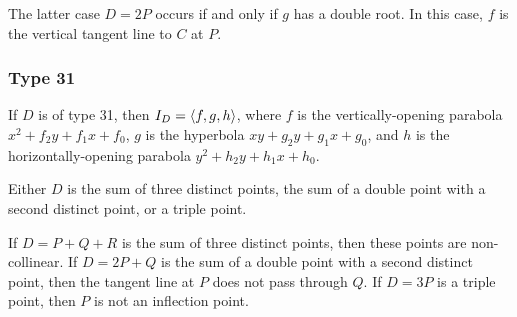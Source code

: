   The latter case $D = 2P$ occurs if and only if $g$ has a double root.
  In this case, $f$ is the vertical tangent line to $C$ at $P$.

\begin{comment}
\subsubsection{Type 21}
  If $D$ is of type 21, then $I_D = \pid{f, g}$, where $f$ is the non-vertical line $y + f_1x + f_0$
  and $g$ is the univariate polynomial $x^2 + g_1x + g_0$.
  Thus $D$ is the sum of two points on the line $f$, whose $x$-coordinates are the roots of $g$.
  
  There are two possibilities.
  If $g$ has two distinct roots, then $D = P + Q$ for two distinct points $P$ and $Q$.
  If $g$ has a double root, then $D = 2P$ and $f$ is the tangent line at $P$.
  
  So either $D$ is the sum of two distinct points with different $x$-coordinates,
  or $D$ is a double point $D = 2P$ and the tangent line at $P$ is non-vertical.
\end{comment}
\begin{comment}
\subsubsection{Type 22}
  If $D$ is of type 21, then $I_D = \pid{f, g}$, where $f$ is the vertical line $x + f_0$
  and $g$ is the univariate polynomial $y^2 + g_2y + g_0$.
  
  Either $D = P + Q$ is the sum of two distinct points with the same $x$-coordinate but different $y$-coordinates,
  or $D = 2P$ is a double point and the tangent line at $P$ is vertical.
\end{comment}

\subsubsection{Type 31}
  If $D$ is of type 31, then $I_D = \left\langle f, g, h \right\rangle$,
  where $f$ is the vertically-opening parabola $x^2 + f_2y + f_1x + f_0$,
  $g$ is the hyperbola $xy + g_2y + g_1x + g_0$,
  and $h$ is the horizontally-opening parabola $y^2 + h_2y + h_1x + h_0$.
  
  Either $D$ is the sum of three distinct points,
  the sum of a double point with a second distinct point,
  or a triple point.
  
  If $D = P + Q + R$ is the sum of three distinct points, then these points are non-collinear.
  If $D = 2P + Q$ is the sum of a double point with a second distinct point,
  then the tangent line at $P$ does not pass through $Q$.
  If $D = 3P$ is a triple point, then $P$ is not an inflection point.

